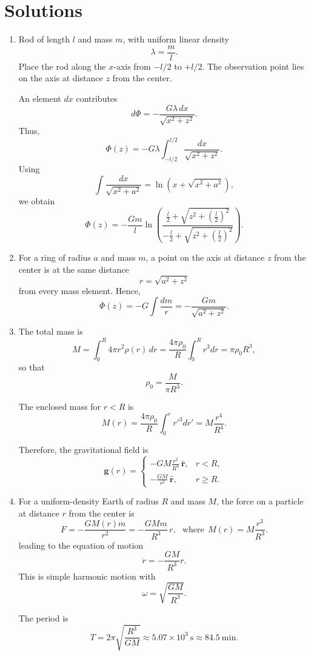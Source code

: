 \documentclass[../main.tex]{subfiles}
\begin{document}
\maketitle

\section*{Solutions}

\begin{enumerate}

\item Rod of length $l$ and mass $m$, with uniform linear density
\[
\lambda=\frac{m}{l}.
\]
Place the rod along the $x$-axis from $-l/2$ to $+l/2$. The observation point lies on the axis at distance $z$ from the center.

An element $dx$ contributes
\[
d\Phi = -\frac{G\lambda\,dx}{\sqrt{x^2+z^2}}.
\]
Thus,
\[
\Phi(z)=-G\lambda\int_{-l/2}^{l/2}\frac{dx}{\sqrt{x^2+z^2}}.
\]
Using
\[
\int \frac{dx}{\sqrt{x^2+a^2}}
=\ln\!\left(x+\sqrt{x^2+a^2}\right),
\]
we obtain
\[
\Phi(z)=-\frac{Gm}{l}
\ln\!\left(
\frac{\frac{l}{2}+\sqrt{z^2+\left(\frac{l}{2}\right)^2}}
{-\frac{l}{2}+\sqrt{z^2+\left(\frac{l}{2}\right)^2}}
\right).
\]

\item For a ring of radius $a$ and mass $m$, a point on the axis at distance $z$ from the center is at the same distance
\[
r=\sqrt{a^2+z^2}
\]
from every mass element. Hence,
\[
\Phi(z)=-G\int\frac{dm}{r}
=-\frac{Gm}{\sqrt{a^2+z^2}}.
\]

\item The total mass is
\[
M=\int_0^R 4\pi r^2\rho(r)\,dr
=\frac{4\pi\rho_0}{R}\int_0^R r^3dr
=\pi\rho_0 R^3,
\]
so that
\[
\rho_0=\frac{M}{\pi R^3}.
\]

The enclosed mass for $r<R$ is
\[
M(r)=\frac{4\pi\rho_0}{R}\int_0^r r'^3dr'
= M\frac{r^4}{R^4}.
\]

Therefore, the gravitational field is
\[
\mathbf g(r)=
\begin{cases}
-\displaystyle G M \frac{r^2}{R^4}\,\hat{\mathbf r},
& r<R,\\[1.2ex]
-\displaystyle \frac{GM}{r^2}\,\hat{\mathbf r},
& r\ge R.
\end{cases}
\]

\item For a uniform-density Earth of radius $R$ and mass $M$, the force on a particle at distance $r$ from the center is
\[
F=-\frac{GM(r)m}{r^2}
=-\frac{GMm}{R^3}\,r, ~~~ \text{where} ~~M(r)=M\frac{r^3}{R^3}.
\]
leading to the equation of motion
\[
\ddot r=-\frac{GM}{R^3}r.
\]
This is simple harmonic motion with
\[
\omega=\sqrt{\frac{GM}{R^3}}.
\]

The period is
\[
T=2\pi\sqrt{\frac{R^3}{GM}}
\approx 5.07\times10^3\ \text{s}
\approx 84.5\ \text{min}.
\]

\end{enumerate}
\end{document}
